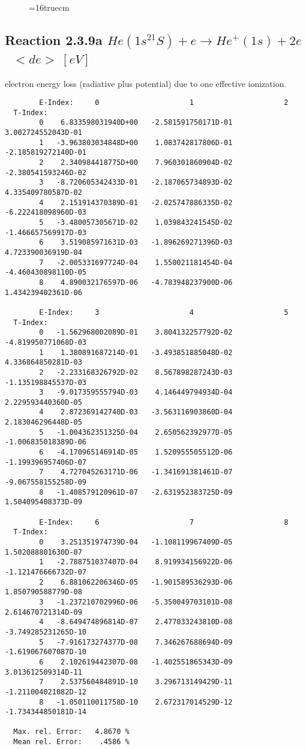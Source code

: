 \documentclass[12pt,dvipdfmx]{article}
\begin{document}
\begin{figure} \label{2.3.2e}
\epsfxsize=16truecm
\end{figure}
\newpage

\subsection{
  Reaction 2.3.9a  $He(1s^21S) + e \rightarrow He^+(1s) + 2e $  \ $ <de> \ [eV] $
}

  electron energy loss (radiative plus potential) due to one effective ionization.

\begin{small}\begin{verbatim}
        E-Index:     0                     1                     2
  T-Index:
        0    6.833598031940D+00   -2.581591750171D-01    3.002724552043D-01
        1   -3.963803034848D+00    1.083742817806D-01   -2.185819272140D-01
        2    2.340984418775D+00    7.960301860904D-02   -2.380541593246D-02
        3   -8.720605342433D-01   -2.187065734893D-02    4.335409780587D-02
        4    2.151914370389D-01   -2.025747886335D-02   -6.222418098960D-03
        5   -3.480057305671D-02    1.039843241545D-02   -1.466657569917D-03
        6    3.519085971631D-03   -1.896269271396D-03    4.723390036919D-04
        7   -2.005331697724D-04    1.550021181454D-04   -4.460430898110D-05
        8    4.890032176597D-06   -4.783948237900D-06    1.434239402361D-06

        E-Index:     3                     4                     5
  T-Index:
        0   -1.562968002089D-01    3.804132257792D-02   -4.819950771068D-03
        1    1.380891687214D-01   -3.493851885048D-02    4.336864850281D-03
        2   -2.233168326792D-02    8.567898287243D-03   -1.135198845537D-03
        3   -9.017359555794D-03    4.146449794934D-04    2.229593440360D-05
        4    2.872369142740D-03   -3.563116903860D-04    2.183046296448D-05
        5   -1.004362351325D-04    2.650562392977D-05   -1.006835018389D-06
        6   -4.170965146914D-05    1.520955505512D-06   -1.199396957406D-07
        7    4.727045263171D-06   -1.341691381461D-07   -9.067558155258D-09
        8   -1.408579120961D-07   -2.631952383725D-09    1.504095408373D-09

        E-Index:     6                     7                     8
  T-Index:
        0    3.251351974739D-04   -1.108119967409D-05    1.502088801630D-07
        1   -2.788751037407D-04    8.919934156922D-06   -1.121476666732D-07
        2    6.881062206346D-05   -1.901589536293D-06    1.850790588779D-08
        3   -1.237210702996D-06   -5.350049703101D-08    2.614670721314D-09
        4   -8.649474896814D-07    2.477033243810D-08   -3.749285231265D-10
        5   -7.916173274377D-08    7.346267688694D-09   -1.619067607087D-10
        6    2.102619442307D-08   -1.402551865343D-09    3.013612509314D-11
        7    2.537560484891D-10    3.296713149429D-11   -1.211004021082D-12
        8   -1.050110011758D-10    2.672317014529D-12   -1.734344850181D-14

  Max. rel. Error:   4.8670 %
  Mean rel. Error:    .4586 %

\end{verbatim}\end{small}
\end{document}
